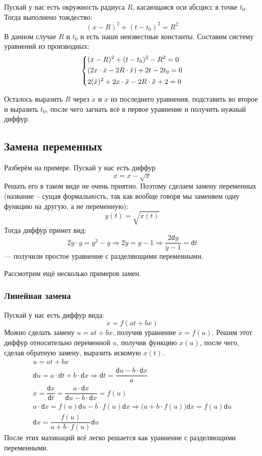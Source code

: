 \documentclass[a4paper,12pt]{article}
\renewcommand{\d}{\mathsf{d}}
\newcommand{\dx}{\dot{x}}
\newcommand{\ddx}{\ddot{x}}
\begin{document}
Пускай у нас есть окружность радиуса $R$, касающаяся оси абсцисс в точке $t_0$. Тогда выполнено тождество:
\[(x - R)^2 + (t - t_0)^2 = R^2\]
В данном случае $R$ и $t_0$ и есть наши неизвестные константы. Составим систему уравнений из производных:
\[\left\{\begin{gathered}
(x - R)^2 + (t - t_0)^2 - R^2 = 0\hfill\\
(2x\cdot \dx - 2R \cdot \dx) + 2t - 2t_0 = 0\hfill\\
2(\dx)^2 + 2x\cdot \ddx - 2R \cdot \ddx + 2 = 0\hfill
\end{gathered}\right.\]

Осталось выразить $R$ через $\dx$ и $\ddx$ из последнего уравнения, подставить во второе и выразить $t_0$, после чего загнать всё в первое уравнение и получить нужный диффур. 

\subsection{Замена переменных}

Разберём на примере. Пускай у нас есть диффур \[\dot{x} = x - \sqrt{x}\] Решать его в таком виде не очень приятно. Поэтому сделаем замену переменных (название -- сущая формальность, так как вообще говоря мы заменяем одну функцию на другую, а не переменную): \[y(t) = \sqrt{x(t)}\] Тогда диффур примет вид:
\[2\dot{y}\cdot y = y^2 - y \Longrightarrow 2\dot{y} = y - 1 \Longrightarrow \dfrac{2\d y}{y - 1} = \d t\] --- получили простое уравнение с разделяющими переменными.

Рассмотрим ещё несколько примеров замен.

\subsubsection{Линейная замена}

Пускай у нас есть диффур вида:
\[\dx = f(at + bx)\]
Можно сделать замену $u = at + bx$, получив уравнение $\dx = f(u)$. Решим этот диффур относительно переменной $u$, получив функцию $x(u)$, после чего, сделав обратную замену, выразить искомую $x(t)$.
\begin{gather*}
	u = at + bx                                                                                        \\
	\d u = a\cdot \d t + b \cdot \d x \Longrightarrow \d t = \dfrac{\d u - b\cdot \d x}{a}             \\
	\dx = \dfrac{\d x}{\d t} = \dfrac{a \cdot \d x}{\d u - b \cdot \d x} = f(u)                        \\
	a \cdot \d x = f(u)\d u - b\cdot f(u)\d x \Longrightarrow \big(a + b\cdot f(u)\big)\d x = f(u)\d u \\
	\d x = \dfrac{f(u)}{a + b \cdot f(u)} \d u
\end{gather*}
После этих махинаций всё легко решается как уравнение с разделяющими переменными.
\end{document}
